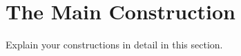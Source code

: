 \section{The Main Construction}
\label{sec:construction}


Explain your constructions in detail in this section.